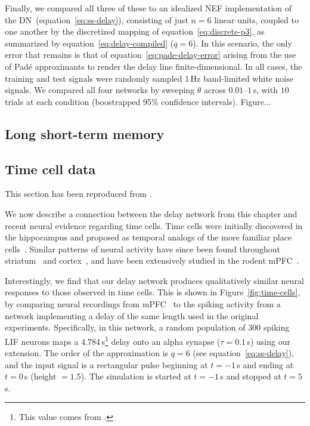 Finally, we compared all three of these to an idealized NEF implementation of the DN~(equation~\ref{eq:ss-delay}), consisting of just $n = 6$ linear units, coupled to one another by the discretized mapping of equation~\ref{eq:discrete-p3}, as summarized by equation~\ref{eq:delay-compiled} ($q = 6$).
In this scenario, the only error that remains is that of equation~\ref{eq:pade-delay-error} arising from the use of Pad\'e approximants to render the delay line finite-dimensional.
In all cases, the training and test signals were randomly sampled $1$\,Hz band-limited white noise signals.
We compared all four networks by sweeping $\theta$ across $0.01$--$1$\,s, with $10$ trials at each condition (boostrapped 95\% confidence intervals).
Figure...

\subsection{Long short-term memory}
\label{sec:delay-lstm}

\subsection{Time cell data}
\label{sec:time-cells}

This section has been reproduced from \citet{voelker2018}.

We now describe a connection between the delay network from this chapter and recent neural evidence regarding time cells.
Time cells were initially discovered in the hippocampus and proposed as temporal analogs of the more familiar place cells~\citep{eichenbaum2014}.
Similar patterns of neural activity have since been found throughout striatum~\citep{mello2015scalable} and cortex~\citep{luczak2015packet}, and have been extensively studied in the rodent mPFC~\citep{kim2013neural, tiganj2016sequential}.

Interestingly, we find that our delay network produces qualitatively similar neural responses to those observed in time cells.
This is shown in Figure~\ref{fig:time-cells}, by comparing neural recordings from mPFC~\citep[][Figure~4~C,D]{tiganj2016sequential} to the spiking activity from a network implementing a delay of the same length used in the original experiments.
Specifically, in this network, a random population of $300$ spiking LIF neurons maps a $4.784$\,s\footnote{%
This value comes from \citet{tiganj2016sequential}.}
delay onto an alpha synapse ($\tau = 0.1$\,s) using our extension.
The order of the approximation is $q = 6$ (see equation~\ref{eq:ss-delay}), and the input signal is a rectangular pulse beginning at $t = -1$\,s and ending at $t = 0$\,s (height $= 1.5$).
The simulation is started at $t = -1$\,s and stopped at $t = 5$\,s.

